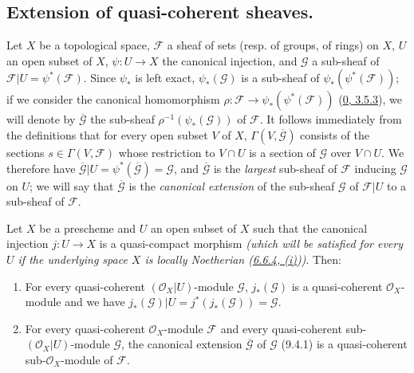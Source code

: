 
\subsection{Extension of quasi-coherent sheaves.}
\label{subsection:I.9.4}

\begin{env}[9.4.1]
\label{I.9.4.1}
Let $X$ be a topological space, $\mathscr{F}$ a sheaf of sets
(resp. of groups, of rings) on $X$, $U$ an open subset of $X$,
$\psi:U\to X$ the canonical injection, and $\mathscr{G}$ a sub-sheaf of
$\mathscr{F}|U=\psi^*(\mathscr{F})$. Since $\psi_*$ is left exact,
$\psi_*(\mathscr{G})$ is a sub-sheaf of
$\psi_*(\psi^*(\mathscr{F}))$; if we consider the canonical homomorphism
$\rho:\mathscr{F}\to\psi_*(\psi^*(\mathscr{F}))$
(\hyperref[0.3.5.3]{0, 3.5.3}), we will denote by
$\overline{\mathscr{G}}$ the sub-sheaf
$\rho^{-1}(\psi_*(\mathscr{G}))$ of $\mathscr{F}$. It follows immediately
from the definitions that for every open subset $V$ of $X$,
$\Gamma(V,\overline{\mathscr{G}})$ consists of the sections
$s\in\Gamma(V,\mathscr{F})$ whose restriction to $V\cap U$ is a section
of $\mathscr{G}$ over $V\cap U$. We therefore have
$\overline{\mathscr{G}}|U=\psi^*(\overline{\mathscr{G}})=\mathscr{G}$, and
$\overline{\mathscr{G}}$ is the \emph{largest} sub-sheaf of
$\mathscr{F}$ inducing $\mathscr{G}$ on $U$; we will say that
$\overline{\mathscr{G}}$ is the \emph{canonical extension} of the
sub-sheaf $\mathscr{G}$ of $\mathscr{F}|U$ to a sub-sheaf of
$\mathscr{F}$.
\end{env}

\begin{proposition}[9.4.2]
\label{I.9.4.2}
Let $X$ be a prescheme and $U$ an open subset of $X$ such that the canonical
injection $j:U\to X$ is a quasi-compact morphism
\emph{(which will be satisfied for \emph{every} $U$ if the underlying space
$X$ is \emph{locally Noetherian}
(\hyperref[I.6.6.4]{6.6.4, (i)}))}. Then:
\begin{enumerate}
\item[(i)] For every quasi-coherent $(\mathscr{O}_X|U)$-module
  $\mathscr{G}$, $j_*(\mathscr{G})$ is a quasi-coherent
  $\mathscr{O}_X$-module and we have
  $j_*(\mathscr{G})|U=j^*(j_*(\mathscr{G}))=\mathscr{G}$.
\item[(ii)] For every quasi-coherent $\mathscr{O}_X$-module $\mathscr{F}$
  and every quasi-coherent sub-$(\mathscr{O}_X|U)$-module $\mathscr{G}$, the
  canonical extension $\overline{\mathscr{G}}$ of $\mathscr{G}$ (9.4.1)
  is a quasi-coherent sub-$\mathscr{O}_X$-module of $\mathscr{F}$.
\end{enumerate}
\end{proposition}

